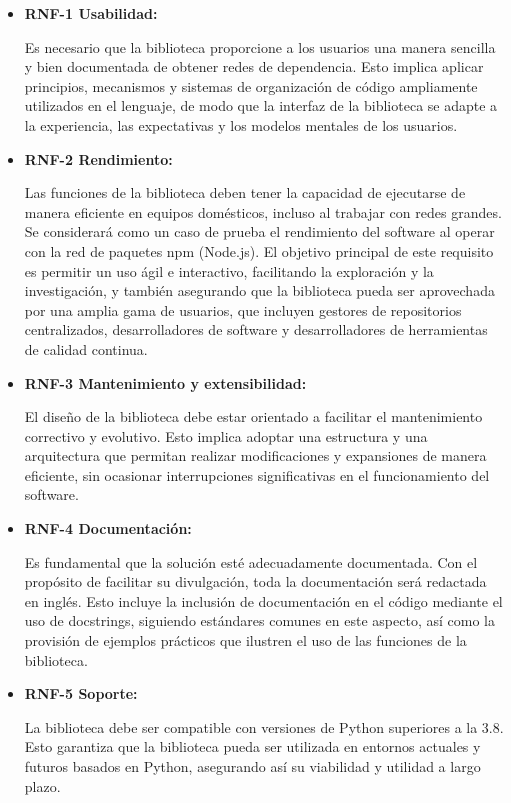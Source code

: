 \begin{itemize}
	\item \textbf{RNF-1 Usabilidad:}

	      Es necesario que la biblioteca proporcione a los usuarios una manera sencilla y
	      bien documentada de obtener redes de dependencia. Esto implica aplicar principios, mecanismos y sistemas de organización
	      de código ampliamente utilizados en el lenguaje, de modo que la interfaz de la biblioteca se adapte a la experiencia,
	      las expectativas y los modelos mentales de los usuarios.

	\item \textbf{RNF-2 Rendimiento:}

	      Las funciones de la biblioteca deben tener la capacidad de ejecutarse de manera eficiente
	      en equipos domésticos, incluso al trabajar con redes grandes. Se considerará como un caso de prueba el rendimiento del software
	      al operar con la red de paquetes npm (Node.js). El objetivo principal de este requisito es permitir un uso ágil e interactivo,
	      facilitando la exploración y la investigación, y también asegurando que la biblioteca pueda ser aprovechada por una amplia gama
	      de usuarios, que incluyen gestores de repositorios centralizados, desarrolladores de software y desarrolladores de herramientas
	      de calidad continua.

	\item \textbf{RNF-3 Mantenimiento y extensibilidad:}

	      El diseño de la biblioteca debe estar orientado a facilitar el mantenimiento
	      correctivo y evolutivo. Esto implica adoptar una estructura y una arquitectura que permitan realizar modificaciones y expansiones
	      de manera eficiente, sin ocasionar interrupciones significativas en el funcionamiento del software.

	\item \textbf{RNF-4 Documentación:}

	      Es fundamental que la solución esté adecuadamente documentada. Con el propósito de facilitar
	      su divulgación, toda la documentación será redactada en inglés. Esto incluye la inclusión de documentación en el código mediante
	      el uso de docstrings, siguiendo estándares comunes en este aspecto, así como la provisión de ejemplos prácticos que ilustren el
	      uso de las funciones de la biblioteca.

	\item \textbf{RNF-5 Soporte:}

	      La biblioteca debe ser compatible con versiones de Python superiores a la 3.8. Esto garantiza que
	      la biblioteca pueda ser utilizada en entornos actuales y futuros basados en Python, asegurando así su viabilidad y utilidad a
	      largo plazo.
\end{itemize}

